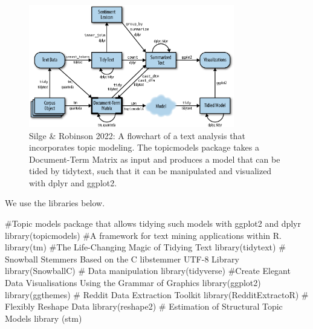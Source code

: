 \documentclass[
  letterpaper,
  DIV=11,
  numbers=noendperiod]{scrreprt}
\newenvironment{Shaded}{\begin{snugshade}}{\end{snugshade}}
\newcommand{\CommentTok}[1]{\textcolor[rgb]{0.37,0.37,0.37}{#1}}
\newcommand{\FunctionTok}[1]{\textcolor[rgb]{0.28,0.35,0.67}{#1}}
\newcommand{\NormalTok}[1]{\textcolor[rgb]{0.00,0.23,0.31}{#1}}
\begin{document}
\begin{figure}

{\centering \includegraphics[width=0.8\textwidth,height=\textheight]{./figs/chp7/tmwr_0601.png}

}

\caption{Silge \& Robinson 2022: A flowchart of a text analysis that
incorporates topic modeling. The topicmodels package takes a
Document-Term Matrix as input and produces a model that can be tided by
tidytext, such that it can be manipulated and visualized with dplyr and
ggplot2.}

\end{figure}

We use the libraries below.

\begin{Shaded}
\begin{Highlighting}[]
\CommentTok{\#Topic models package that allows tidying such models with ggplot2 and dplyr}
\FunctionTok{library}\NormalTok{(topicmodels)}
\CommentTok{\#A framework for text mining applications within R.}
\FunctionTok{library}\NormalTok{(tm)}
\CommentTok{\#The Life{-}Changing Magic of Tidying Text}
\FunctionTok{library}\NormalTok{(tidytext)}
\CommentTok{\# Snowball Stemmers Based on the C \textquotesingle{}libstemmer\textquotesingle{} UTF{-}8 Library}
\FunctionTok{library}\NormalTok{(SnowballC)}
\CommentTok{\# Data manipulation}
\FunctionTok{library}\NormalTok{(tidyverse)}
\CommentTok{\#Create Elegant Data Visualisations Using the Grammar of Graphics}
\FunctionTok{library}\NormalTok{(ggplot2)}
\FunctionTok{library}\NormalTok{(ggthemes)}
\CommentTok{\# Reddit Data Extraction Toolkit}
\FunctionTok{library}\NormalTok{(RedditExtractoR)}
\CommentTok{\# Flexibly Reshape Data}
\FunctionTok{library}\NormalTok{(reshape2)}
\CommentTok{\# Estimation of Structural Topic Models}
\FunctionTok{library}\NormalTok{ (stm)}
\end{Highlighting}
\end{Shaded}
\end{document}

